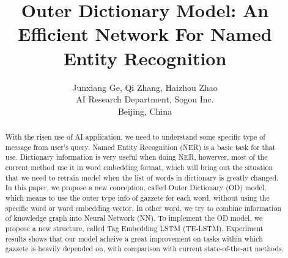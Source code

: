 \documentclass[letterpaper]{article} %
\title{ Outer Dictionary Model: An Efficient Network For Named Entity Recognition }
\author{Junxiang Ge, Qi Zhang, Haizhou Zhao\\ 
AI Research Department, Sogou Inc. \\
Beijing, China}
\begin{document}
\maketitle

\begin{abstract}
With the risen use of AI application, we need to understand some specific type of message from user's query. Named Entity Recognition (NER) is a basic task for that use. Dictionary information is very useful when doing NER, howerver, most of the current method use it in word embedding format, which will bring out the situation that we need to retrain model when the list of words in dictionary is greatly changed. In this paper, we propose a new conception, called Outer Dictionary (OD) model, which means to use the outer type info of gazzete for each word, without using the specific word or word embedding vector. In other word, we try to combine information of knowledge graph into Neural Network (NN). To implement the OD model, we propose a new structure, called Tag Embedding LSTM (TE-LSTM). Experiment results shows that our model acheive a great improvement on tasks within which gazzete is heavily depended on, with comparison with current state-of-the-art methods. 
\end{abstract}
\end{document}
